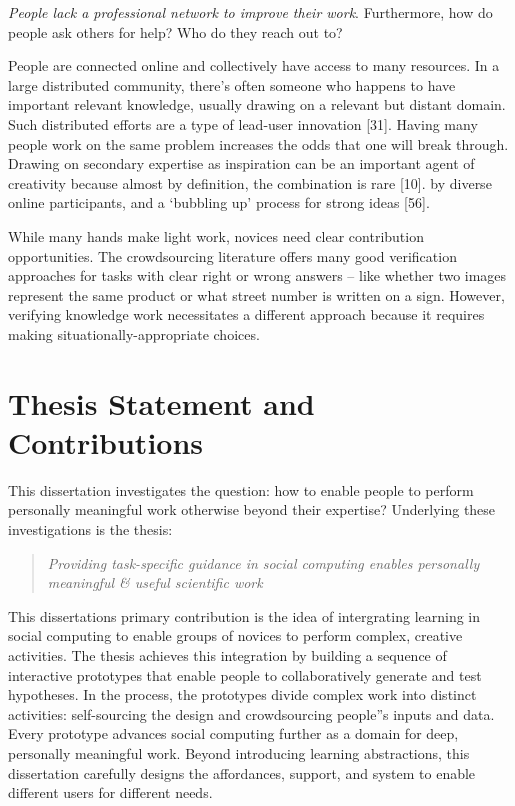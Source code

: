 

\textit{People lack a professional network to improve their work}. 
Furthermore,  how do people ask others for help? Who do they reach out to?

People are connected online and collectively have access to many resources.
In a large distributed community, there’s often someone who happens to 
have important relevant knowledge, usually drawing on a relevant but 
distant domain. Such distributed efforts are a type of lead-user innovation [31]. 
Having many people work on the same problem increases the odds that 
one will break through. Drawing on secondary expertise as inspiration can
 be an important agent of creativity because almost by definition, the 
combination is rare [10]. %
 by diverse online participants, and a ‘bubbling up’ process for strong ideas [56].

While many hands make light work, novices need clear contribution opportunities. 
The crowdsourcing literature offers many good verification approaches for tasks 
with clear right or wrong answers – like whether two images represent the same 
product or what street number is written on a sign. However, verifying knowledge
 work necessitates a different approach because it requires making 
situationally-appropriate choices. 

\section{Thesis Statement and Contributions}
\noindent This dissertation investigates the question: how to enable people to perform personally meaningful work otherwise beyond their expertise? Underlying these investigations is the thesis:
\begin{quote}
\emph{Providing task-specific guidance in social computing enables personally meaningful \& useful scientific work}
\end{quote}

This dissertation\textquotesingle s primary contribution is the idea of intergrating learning in social computing to enable groups of novices to perform complex, creative activities. The thesis achieves this integration by building a sequence of interactive prototypes that enable people to collaboratively generate and test hypotheses. In the process, the prototypes divide complex work into distinct activities: self-sourcing the design and crowdsourcing people''s inputs and data. Every prototype advances social computing further as a domain for deep, personally meaningful work. Beyond introducing learning abstractions, this dissertation carefully designs the affordances, support, and system to enable different users for different needs. 

